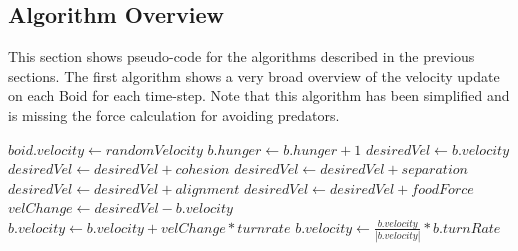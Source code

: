 \documentclass{egpubl}
\begin{document}
\subsection{Algorithm Overview}
This section shows pseudo-code for the algorithms described in the previous sections. The first algorithm shows a very broad overview of the velocity update on each Boid for each time-step. Note that this algorithm has been simplified and is missing the force calculation for avoiding predators. 
\begin{algorithmic}
    \State $boid.velocity \gets randomVelocity$
\EndFor
{}
        \State $b.hunger \gets b.hunger + 1$
        \State $desiredVel \gets b.velocity$
        \State $desiredVel \gets desiredVel + cohesion$
        \State $desiredVel \gets desiredVel + separation$
        \State $desiredVel \gets desiredVel + alignment$
            \State $desiredVel \gets desiredVel + foodForce$
        \EndIf
        \State $velChange \gets desiredVel - b.velocity$
        \State $b.velocity \gets b.velocity + velChange * turnrate$
        \State $b.velocity \gets \frac{b.velocity}{|b.velocity|} * b.turnRate$
    \EndFor
\EndFor
\EndWhile
\end{algorithmic}
\end{document}
